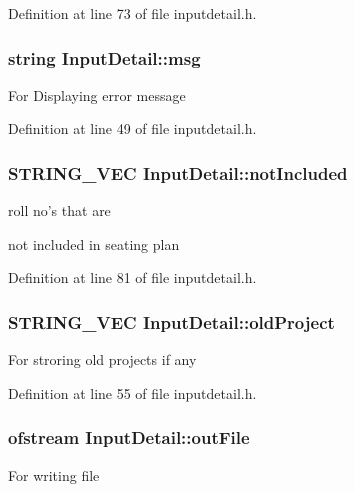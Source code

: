 Definition at line 73 of file inputdetail.\-h.

\hypertarget{classInputDetail_a1abb16cd695678c3fa05e3c812823fee}{
\subsubsection[{msg}]{\setlength{\rightskip}{0pt plus 5cm}string Input\-Detail\-::msg\hspace{0.3cm}{\ttfamily [protected]}}}\label{classInputDetail_a1abb16cd695678c3fa05e3c812823fee}
For Displaying error message 

Definition at line 49 of file inputdetail.\-h.

\hypertarget{classInputDetail_aba862d64d7f84a385e528d0daf42e9fc}{
\subsubsection[{not\-Included}]{\setlength{\rightskip}{0pt plus 5cm}S\-T\-R\-I\-N\-G\-\_\-\-V\-E\-C Input\-Detail\-::not\-Included\hspace{0.3cm}{\ttfamily [protected]}}}\label{classInputDetail_aba862d64d7f84a385e528d0daf42e9fc}
\begin{DoxyVerb}         roll no's that are 
\end{DoxyVerb}
 not included in seating plan 

Definition at line 81 of file inputdetail.\-h.

\hypertarget{classInputDetail_ae8ccc2e838c6d5a93ea544370dc1f272}{
\subsubsection[{old\-Project}]{\setlength{\rightskip}{0pt plus 5cm}S\-T\-R\-I\-N\-G\-\_\-\-V\-E\-C Input\-Detail\-::old\-Project\hspace{0.3cm}{\ttfamily [protected]}}}\label{classInputDetail_ae8ccc2e838c6d5a93ea544370dc1f272}
For stroring old projects if any 

Definition at line 55 of file inputdetail.\-h.

\hypertarget{classInputDetail_a2b8484cfbfee98ae69e8476f8fd40000}{
\subsubsection[{out\-File}]{\setlength{\rightskip}{0pt plus 5cm}ofstream Input\-Detail\-::out\-File\hspace{0.3cm}{\ttfamily [protected]}}}\label{classInputDetail_a2b8484cfbfee98ae69e8476f8fd40000}
For writing file 

